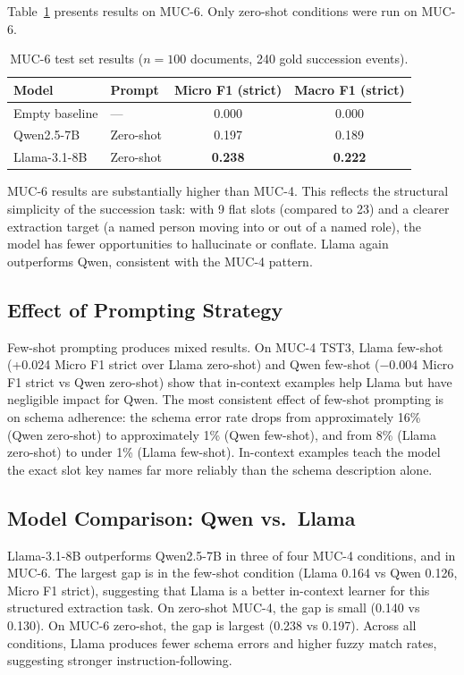 \documentclass[11pt,a4paper]{article}
\begin{document}
Table~\ref{tab:muc6_results} presents results on MUC-6. Only zero-shot conditions were run on MUC-6.

\begin{table}[h]
\centering
\caption{MUC-6 test set results ($n=100$ documents, 240 gold succession events).}
\label{tab:muc6_results}
\begin{tabular}{llcc}
\toprule
\textbf{Model} & \textbf{Prompt} & \textbf{Micro F1 (strict)} & \textbf{Macro F1 (strict)} \\
\midrule
Empty baseline    & —         & 0.000 & 0.000 \\
Qwen2.5-7B        & Zero-shot & 0.197 & 0.189 \\
Llama-3.1-8B      & Zero-shot & \textbf{0.238} & \textbf{0.222} \\
\bottomrule
\end{tabular}
\end{table}

MUC-6 results are substantially higher than MUC-4. This reflects the structural simplicity of the succession task: with 9 flat slots (compared to 23) and a clearer extraction target (a named person moving into or out of a named role), the model has fewer opportunities to hallucinate or conflate. Llama again outperforms Qwen, consistent with the MUC-4 pattern.

\subsection{Effect of Prompting Strategy}

Few-shot prompting produces mixed results. On MUC-4 TST3, Llama few-shot (+0.024 Micro F1 strict over Llama zero-shot) and Qwen few-shot (−0.004 Micro F1 strict vs Qwen zero-shot) show that in-context examples help Llama but have negligible impact for Qwen. The most consistent effect of few-shot prompting is on schema adherence: the schema error rate drops from approximately 16\% (Qwen zero-shot) to approximately 1\% (Qwen few-shot), and from 8\% (Llama zero-shot) to under 1\% (Llama few-shot). In-context examples teach the model the exact slot key names far more reliably than the schema description alone.

\subsection{Model Comparison: Qwen vs.\ Llama}

Llama-3.1-8B outperforms Qwen2.5-7B in three of four MUC-4 conditions, and in MUC-6. The largest gap is in the few-shot condition (Llama 0.164 vs Qwen 0.126, Micro F1 strict), suggesting that Llama is a better in-context learner for this structured extraction task. On zero-shot MUC-4, the gap is small (0.140 vs 0.130). On MUC-6 zero-shot, the gap is largest (0.238 vs 0.197). Across all conditions, Llama produces fewer schema errors and higher fuzzy match rates, suggesting stronger instruction-following.
\end{document}
